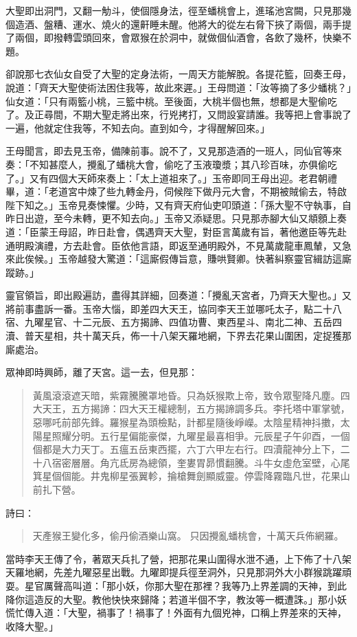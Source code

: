 大聖即出洞門，又翻一觔斗，使個隱身法，徑至蟠桃會上，進瑤池宮闕，只見那幾個造酒、盤糟、運水、燒火的還鼾睡未醒。他將大的從左右脅下挾了兩個，兩手提了兩個，即撥轉雲頭回來，會眾猴在於洞中，就做個仙酒會，各飲了幾杯，快樂不題。

卻說那七衣仙女自受了大聖的定身法術，一周天方能解脫。各提花籃，回奏王母，說道：「齊天大聖使術法困住我等，故此來遲。」王母問道：「汝等摘了多少蟠桃？」仙女道：「只有兩籃小桃，三籃中桃。至後面，大桃半個也無，想都是大聖偷吃了。及正尋間，不期大聖走將出來，行兇拷打，又問設宴請誰。我等把上會事說了一遍，他就定住我等，不知去向。直到如今，才得醒解回來。」

王母聞言，即去見玉帝，備陳前事。說不了，又見那造酒的一班人，同仙官等來奏：「不知甚麼人，攪亂了蟠桃大會，偷吃了玉液瓊漿；其八珍百味，亦俱偷吃了。」又有四個大天師來奏上：「太上道祖來了。」玉帝即同王母出迎。老君朝禮畢，道：「老道宮中煉了些九轉金丹，伺候陛下做丹元大會，不期被賊偷去，特啟陛下知之。」玉帝見奏悚懼。少時，又有齊天府仙吏叩頭道：「孫大聖不守執事，自昨日出遊，至今未轉，更不知去向。」玉帝又添疑思。只見那赤腳大仙又頫顖上奏道：「臣蒙王母詔，昨日赴會，偶遇齊天大聖，對臣言萬歲有旨，著他邀臣等先赴通明殿演禮，方去赴會。臣依他言語，即返至通明殿外，不見萬歲龍車鳳輦，又急來此俟候。」玉帝越發大驚道：「這廝假傳旨意，賺哄賢卿。快著糾察靈官緝訪這廝蹤跡。」

靈官領旨，即出殿遍訪，盡得其詳細，回奏道：「攪亂天宮者，乃齊天大聖也。」又將前事盡訴一番。玉帝大惱，即差四大天王，協同李天王並哪吒太子，點二十八宿、九曜星官、十二元辰、五方揭諦、四值功曹、東西星斗、南北二神、五岳四瀆、普天星相，共十萬天兵，佈一十八架天羅地網，下界去花果山圍困，定捉獲那廝處治。

眾神即時興師，離了天宮。這一去，但見那：
\begin{quote}
黃風滾滾遮天暗，紫霧騰騰罩地昏。只為妖猴欺上帝，致令眾聖降凡塵。四大天王，五方揭諦：四大天王權總制，五方揭諦調多兵。李托塔中軍掌號，惡哪吒前部先鋒。羅猴星為頭檢點，計都星隨後崢嶸。太陰星精神抖擻，太陽星照耀分明。五行星偏能豪傑，九曜星最喜相爭。元辰星子午卯酉，一個個都是大力天丁。五瘟五岳東西擺，六丁六甲左右行。四瀆龍神分上下，二十八宿密層層。角亢氐房為總領，奎婁胃昴慣翻騰。斗牛女虛危室壁，心尾箕星個個能。井鬼柳星張翼軫，掄槍舞劍顯威靈。停雲降霧臨凡世，花果山前扎下營。
\end{quote}

詩曰：
\begin{quote}
天產猴王變化多，偷丹偷酒樂山窩。
只因攪亂蟠桃會，十萬天兵佈網羅。
\end{quote}

當時李天王傳了令，著眾天兵扎了營，把那花果山圍得水泄不通，上下佈了十八架天羅地網，先差九曜惡星出戰。九曜即提兵徑至洞外，只見那洞外大小群猴跳躍頑耍。星官厲聲高叫道：「那小妖，你那大聖在那裡？我等乃上界差調的天神，到此降你這造反的大聖。教他快快來歸降；若道半個不字，教汝等一概遭誅。」那小妖慌忙傳入道：「大聖，禍事了！禍事了！外面有九個兇神，口稱上界差來的天神，收降大聖。」


